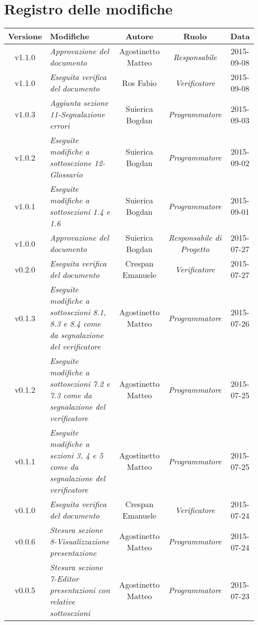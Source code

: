 \newpage
\section*{Registro delle modifiche}

\begin{table}[h]
\centering
\begin{tabular}{|c|p{}|c|c|c|}
	\toprule
		\textbf{Versione} & \textbf{Modifiche} & \textbf{Autore} & \textbf{Ruolo} & \textbf{Data}\\
	\midrule
	\midrule
		v1.1.0 & \textit{Approvazione del documento} & Agostinetto Matteo & \textit{Responsabile} & 2015-09-08\\
	\midrule
		v1.1.0 & \textit{Eseguita verifica del documento} & Ros Fabio & \textit{Verificatore} & 2015-09-08\\
	\midrule
		v1.0.3 & \textit{Aggiunta sezione 11-Segnalazione errori} & Suierica Bogdan & \textit{Programmatore} & 2015-09-03\\
	\midrule
		v1.0.2 & \textit{Eseguite modifiche a sottosezione 12-Glossario} & Suierica Bogdan & \textit{Programmatore} & 2015-09-02\\
	\midrule
		v1.0.1 & \textit{Eseguite modifiche a sottosezioni 1.4 e 1.6} & Suierica Bogdan & \textit{Programmatore} & 2015-09-01\\
	\midrule
		v1.0.0 & \textit{Approvazione del documento} & Suierica Bogdan & \textit{Responsabile di Progetto} & 2015-07-27\\
	\midrule
		v0.2.0 & \textit{Eseguita verifica del documento} & Crespan Emanuele & \textit{Verificatore} & 2015-07-27\\
	\midrule
		v0.1.3 & \textit{Eseguite modifiche a sottosezioni 8.1, 8.3 e 8.4 come da segnalazione del verificatore} & Agostinetto Matteo & \textit{Programmatore} & 2015-07-26\\
	\midrule
		v0.1.2 & \textit{Eseguite modifiche a sottosezioni 7.2 e 7.3 come da segnalazione del verificatore} & Agostinetto Matteo & \textit{Programmatore} & 2015-07-25\\
	\midrule
		v0.1.1 & \textit{Eseguite modifiche a sezioni 3, 4 e 5 come da segnalazione del verificatore} & Agostinetto Matteo & \textit{Programmatore} & 2015-07-25\\
	\midrule
		v0.1.0 & \textit{Eseguita verifica del documento} & Crespan Emanuele & \textit{Verificatore} & 2015-07-24\\
	\midrule
		v0.0.6 & \textit{Stesura sezione 8-Visualizzazione presentazione} & Agostinetto Matteo & \textit{Programmatore} & 2015-07-24\\
	\midrule
		v0.0.5 & \textit{Stesura sezione 7-Editor presentazioni con relative sottosezioni} & Agostinetto Matteo & \textit{Programmatore} & 2015-07-23\\
	\bottomrule	
	\end{tabular}
\end{table}
\newpage
	
